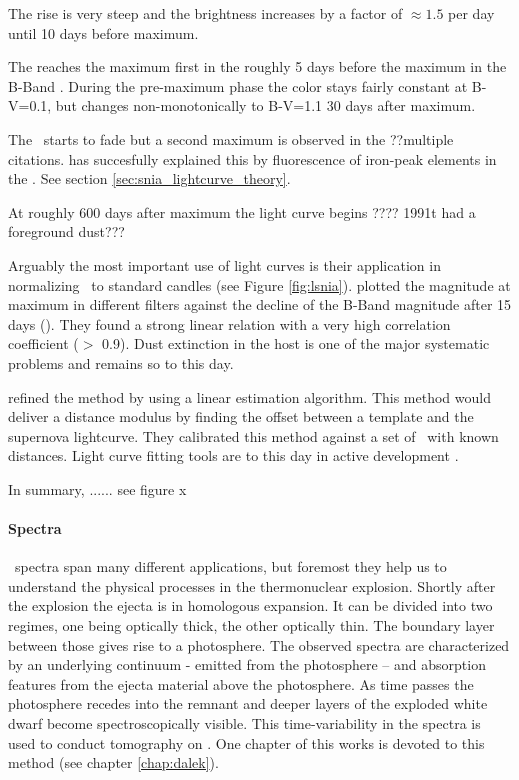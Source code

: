 The rise is very steep and the brightness increases by a factor of $\approx 1.5$ per day until 10 days before maximum. 

The \snia reaches the maximum first in the \nir roughly 5 days before the maximum in the B-Band \citep{2000MNRAS.314..782M}. 
During the pre-maximum phase the color stays fairly constant at B-V=0.1, but changes non-monotonically to B-V=1.1 30 days after maximum. 

The \snia\ starts to fade but  a second maximum is observed in the \nir \citep{2008ApJ...689..377W} ??multiple citations.  \citep{2006ApJ...649..939K} has succesfully explained this by fluorescence of iron-peak elements in the \nir. See section \ref{sec:snia_lightcurve_theory}.

At roughly 600 days after maximum the light curve begins ???? 1991t had a foreground dust??? 


Arguably the most important use of light curves is their application in normalizing \sneia\ to standard candles (see Figure \ref{fig:lsnia}). \citet[][]{1993ApJ...413L.105P} plotted the magnitude at maximum in different filters against the decline of the B-Band magnitude after 15 days (\dmb).  They found a strong linear relation with a very high correlation coefficient ($>$ 0.9). Dust extinction in the host is one of the major systematic problems and remains so to this day. 

\cite{1995ApJ...438L..17R} refined the method by using a linear estimation algorithm. This method would deliver a distance modulus by finding the offset between a template and the supernova lightcurve. They calibrated this method against a set of \sneia\ with known distances. 
Light curve fitting tools are to this day in active development \cite[e.g.][]{2007ApJ...659..122J, 2007A&A...466...11G}.

In summary, ...... see figure x



\paragraph{Spectra} \sneia\ spectra span many different applications, but foremost they help us to understand the physical processes in the thermonuclear explosion. 
Shortly after the explosion the ejecta is in homologous expansion. It can be divided into two regimes, one being optically thick, the other optically thin. The boundary layer between those gives rise to a  photosphere. The observed spectra are characterized by an underlying continuum - emitted from the photosphere -- and absorption features from the ejecta material above the photosphere. 
As time passes the photosphere recedes into the remnant and deeper layers of the exploded white dwarf become spectroscopically visible. 
This time-variability in the spectra is used to conduct tomography on \sneia. One chapter of this works is devoted to this method (see chapter \ref{chap:dalek}). 


